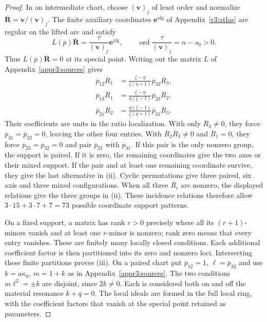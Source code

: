 \documentclass[11pt,a4paper]{article}
\numberwithin{equation}{section}
\theoremstyle{plain}
\theoremstyle{definition}
\theoremstyle{remark}
\begin{document}
\begin{proof}
In an intermediate chart, choose $(\boldsymbol v)_j$ of least order and normalize
$\overline{\boldsymbol R}=\boldsymbol v/(\boldsymbol v)_j$. The finite auxiliary
coordinates $\boldsymbol e^{\mathrm{alg}}$ of Appendix~\ref{r3:atlas}
are regular on the lifted arc and satisfy
\[
 L(\overline p)\overline{\boldsymbol R}
       =\frac{\tau}{(\boldsymbol v)_j}\boldsymbol e^{\mathrm{alg}},\qquad
 \operatorname{ord}\frac{\tau}{(\boldsymbol v)_j}=n-s_0>0.
\]
Thus $L(\overline p)\overline{\boldsymbol R}=0$ at its special point.
Writing out the matrix $L$ of Appendix~\ref{appr3:sources} gives
\[
\begin{aligned}
\overline p_{12}\overline R_1
 &=\frac{\zeta-\eta}{\zeta(\eta+1)}
       \overline p_{32}\overline R_3,\\
\overline p_{13}\overline R_1
 &=\frac{\zeta-\eta}{\eta(\zeta-1)}
       \overline p_{23}\overline R_2,\\
\overline p_{21}\overline R_2
 &=\frac{\eta(\zeta-1)}{\zeta(\eta+1)}
       \overline p_{31}\overline R_3.
\end{aligned}
\]
Their coefficients are units in the ratio localization. With only
$\overline R_3\ne0$, they force
$\overline p_{31}=\overline p_{32}=0$, leaving the other four entries.
With $\overline R_2\overline R_3\ne0$ and $\overline R_1=0$, they
force $\overline p_{23}=\overline p_{32}=0$ and pair
$\overline p_{21}$ with $\overline p_{31}$. If this pair is the only
nonzero group, the support is paired. If it is zero, the remaining
coordinates give the two axes or their mixed support. If the pair
and at least one remaining coordinate survive, they give the last
alternative in \textup{(ii)}.
Cyclic permutations give three paired, six axis and three mixed
configurations. When all three $\overline R_i$ are nonzero, the
displayed relations give the three groups in \textup{(ii)}.
These incidence relations therefore allow
$3\cdot15+3\cdot7+7=73$ possible coordinate support patterns.

On a fixed support, a matrix has rank $r>0$ precisely where all its
$(r+1)$-minors vanish and at least one $r$-minor is nonzero; rank zero
means that every entry vanishes. These are finitely many locally
closed conditions. Each additional coefficient factor is then
partitioned into its zero and nonzero loci. Intersecting these finite
partitions proves \textup{(iii)}. On a paired chart put
$\overline p_{12}=1$, $\ell=\overline p_{32}$ and use $k=a\kappa_0$, $m=1+k$
as in Appendix~\ref{appr3:sources}. The two conditions
$m\ell^2=\pm k$ are disjoint, since
$2k\ne0$. Each is considered both on and off the material
resonance $k+q=0$. The local ideals are formed in the full local
ring, with the coefficient factors that vanish at the special point
retained as parameters.


\end{proof}
\end{document}
